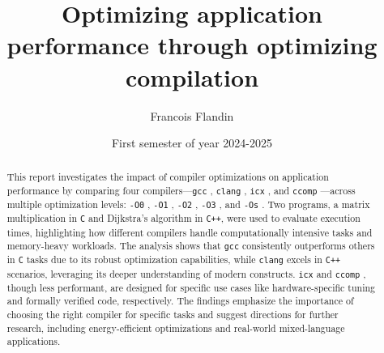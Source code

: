 \documentclass{rapport}
\title{Optimizing application performance through optimizing compilation}
\author{Francois Flandin}
\date{First semester of year 2024-2025}
\newcommand{\gcc}{\texttt{gcc} }
\newcommand{\icx}{\texttt{icx} }
\newcommand{\clang}{\texttt{clang} }
\newcommand{\comp}{\texttt{ccomp} }
\newcommand{\optizero}{\texttt{-O0} }
\newcommand{\optione}{\texttt{-O1} }
\newcommand{\optitwo}{\texttt{-O2} }
\newcommand{\optithree}{\texttt{-O3} }
\newcommand{\optisize}{\texttt{-Os} }
\begin{document}
\maketitle

\begin{abstract}
This report investigates the impact of compiler optimizations on application performance by comparing four compilers—\gcc, \clang, \icx, and \comp—across multiple optimization levels: 
\optizero, \optione, \optitwo, \optithree, and \optisize. 
\newline
Two programs, a matrix multiplication in \texttt{C} and Dijkstra’s algorithm in \texttt{C++}, were used to evaluate execution 
times, highlighting how different compilers handle computationally intensive tasks and memory-heavy workloads. 
\newline
The analysis shows that \gcc consistently outperforms others in \texttt{C}
tasks due to its robust optimization capabilities, while \clang excels in \texttt{C++} scenarios, leveraging its deeper understanding of modern constructs. \newline
\icx and \comp, though less performant, are designed for specific use cases like hardware-specific tuning and formally verified code, respectively. \newline
The findings emphasize the importance of choosing the right compiler for specific tasks and suggest directions for further research, including energy-efficient 
optimizations and real-world mixed-language applications.
\end{abstract}

\clearpage

\tableofcontents

\clearpage
\end{document}
